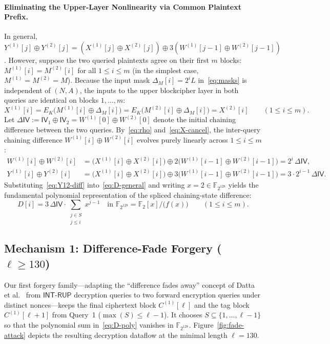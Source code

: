 \documentclass[11pt,a4paper]{article}
\theoremstyle{definition}
\theoremstyle{remark}
\newcommand{\Ftwo}{\mathbb{F}_2}
\newcommand{\FtwoN}{\mathbb{F}_{2^{128}}}
\newcommand{\IV}{\mathsf{IV}}
\begin{document}
\paragraph{Eliminating the Upper-Layer Nonlinearity via Common Plaintext Prefix.}
In general, $Y^{(1)}[j] \oplus Y^{(2)}[j] = (X^{(1)}[j] \oplus X^{(2)}[j]) \oplus 3(W^{(1)}[j-1] \oplus W^{(2)}[j-1])$. However, suppose the two queried plaintexts agree on their first $m$ blocks: $M^{(1)}[i] = M^{(2)}[i]$ for all $1 \le i \le m$ (in the simplest case, $M^{(1)} = M^{(2)} = M$). Because the input mask $\Delta_M[i] = 2^i L$ in~\eqref{eq:masks} is independent of $(N, A)$, the inputs to the upper blockcipher layer in both queries are identical on blocks $1, \dots, m$:
\begin{equation}
\label{eq:X-cancel}
X^{(1)}[i] = E_K\big(M^{(1)}[i] \oplus \Delta_M[i]\big) = E_K\big(M^{(2)}[i] \oplus \Delta_M[i]\big) = X^{(2)}[i] \qquad (1 \le i \le m).
\end{equation}
Let $\Delta\IV := \IV_1 \oplus \IV_2 = W^{(1)}[0] \oplus W^{(2)}[0]$ denote the initial chaining difference between the two queries. By~\eqref{eq:rho} and~\eqref{eq:X-cancel}, the inter-query chaining difference $W^{(1)}[i] \oplus W^{(2)}[i]$ evolves purely linearly across $1 \le i \le m$:
\begin{align}
W^{(1)}[i] \oplus W^{(2)}[i] &= \big(X^{(1)}[i] \oplus X^{(2)}[i]\big) \oplus 2\big(W^{(1)}[i-1] \oplus W^{(2)}[i-1]\big) = 2^i \, \Delta\IV, \label{eq:W12-diff} \\
Y^{(1)}[i] \oplus Y^{(2)}[i] &= \big(X^{(1)}[i] \oplus X^{(2)}[i]\big) \oplus 3\big(W^{(1)}[i-1] \oplus W^{(2)}[i-1]\big) = 3 \cdot 2^{i-1} \, \Delta\IV. \label{eq:Y12-diff}
\end{align}
Substituting~\eqref{eq:Y12-diff} into~\eqref{eq:D-general} and writing $x = 2 \in \FtwoN$ yields the fundamental polynomial representation of the spliced chaining-state difference:
\begin{equation}
\label{eq:D-poly}
D[i] = 3 \, \Delta\IV \cdot \sum_{\substack{j \in S \\ j \le i}} x^{j-1} \quad \text{in } \FtwoN = \Ftwo[x]/\big(f(x)\big) \qquad (1 \le i \le m).
\end{equation}

\subsection{Mechanism 1: Difference-Fade Forgery (\texorpdfstring{$\ell \ge 130$}{l >= 130})}
Our first forgery family---adapting the ``difference fades away'' concept of Datta et al.~\cite[Section~6]{DLMN17} from $\mathsf{INT\text{-}RUP}$ decryption queries to two forward encryption queries under distinct nonces---keeps the final ciphertext block $C^{(1)}[\ell]$ and the tag block $C^{(1)}[\ell+1]$ from Query~1 ($\max(S) \le \ell - 1$). It chooses $S \subseteq \{1, \dots, \ell - 1\}$ so that the polynomial sum in~\eqref{eq:D-poly} vanishes in $\FtwoN$. Figure~\ref{fig:fade-attack} depicts the resulting decryption dataflow at the minimal length $\ell = 130$.
\end{document}
